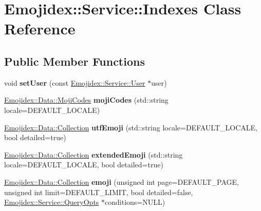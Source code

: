 \hypertarget{classEmojidex_1_1Service_1_1Indexes}{}\section{Emojidex\+:\+:Service\+:\+:Indexes Class Reference}
\label{classEmojidex_1_1Service_1_1Indexes}
\subsection*{Public Member Functions}
\begin{DoxyCompactItemize}
\item 
void {\bfseries set\+User} (const \hyperlink{classEmojidex_1_1Service_1_1User}{Emojidex\+::\+Service\+::\+User} $\ast$user)\hypertarget{classEmojidex_1_1Service_1_1Indexes_a94824b67e2e46b7bf46e1ec9f0040226}{}\label{classEmojidex_1_1Service_1_1Indexes_a94824b67e2e46b7bf46e1ec9f0040226}

\item 
\hyperlink{classEmojidex_1_1Data_1_1MojiCodes}{Emojidex\+::\+Data\+::\+Moji\+Codes} {\bfseries moji\+Codes} (std\+::string locale=D\+E\+F\+A\+U\+L\+T\+\_\+\+L\+O\+C\+A\+LE)\hypertarget{classEmojidex_1_1Service_1_1Indexes_aad2b2a930b7665cc9a195cbaf302eb49}{}\label{classEmojidex_1_1Service_1_1Indexes_aad2b2a930b7665cc9a195cbaf302eb49}

\item 
\hyperlink{classEmojidex_1_1Data_1_1Collection}{Emojidex\+::\+Data\+::\+Collection} {\bfseries utf\+Emoji} (std\+::string locale=D\+E\+F\+A\+U\+L\+T\+\_\+\+L\+O\+C\+A\+LE, bool detailed=true)\hypertarget{classEmojidex_1_1Service_1_1Indexes_a0c2b3e28fe19af86b556a9d5641ddeb4}{}\label{classEmojidex_1_1Service_1_1Indexes_a0c2b3e28fe19af86b556a9d5641ddeb4}

\item 
\hyperlink{classEmojidex_1_1Data_1_1Collection}{Emojidex\+::\+Data\+::\+Collection} {\bfseries extended\+Emoji} (std\+::string locale=D\+E\+F\+A\+U\+L\+T\+\_\+\+L\+O\+C\+A\+LE, bool detailed=true)\hypertarget{classEmojidex_1_1Service_1_1Indexes_a9106f50086dec7ff8496589883d5bd37}{}\label{classEmojidex_1_1Service_1_1Indexes_a9106f50086dec7ff8496589883d5bd37}

\item 
\hyperlink{classEmojidex_1_1Data_1_1Collection}{Emojidex\+::\+Data\+::\+Collection} {\bfseries emoji} (unsigned int page=D\+E\+F\+A\+U\+L\+T\+\_\+\+P\+A\+GE, unsigned int limit=D\+E\+F\+A\+U\+L\+T\+\_\+\+L\+I\+M\+IT, bool detailed=false, \hyperlink{classEmojidex_1_1Service_1_1QueryOpts}{Emojidex\+::\+Service\+::\+Query\+Opts} $\ast$conditions=N\+U\+LL)\hypertarget{classEmojidex_1_1Service_1_1Indexes_ac0aaddbd46779ced7502b6e1f4f81aa9}{}\label{classEmojidex_1_1Service_1_1Indexes_ac0aaddbd46779ced7502b6e1f4f81aa9}


\end{DoxyCompactItemize}
